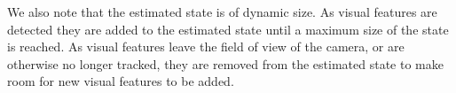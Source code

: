 


We also note
that the estimated state is of dynamic size. As visual features are
detected they are added to the estimated state until a maximum size of the state
is reached. As visual features leave the field of view of the camera,
or are otherwise no longer tracked, they are removed from the estimated state
to make room for new visual features to be added.


